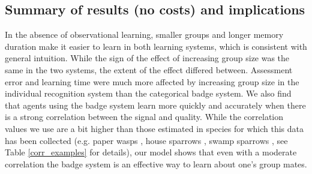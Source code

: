 \subsection*{Summary of results (no costs) and implications} %
In the absence of observational learning, smaller groups and longer memory duration make it easier to learn in both learning systems, which is consistent with general intuition. While the sign of the effect of increasing group size was the same in the two systems, the extent of the effect differed between. Assessment error and learning time were much more affected by increasing group size in the individual recognition system than the categorical badge system. We also find that agents using the badge system learn more quickly and accurately when there is a strong correlation between the signal and quality. While the correlation values we use are a bit higher than those estimated in species for which this data has been collected (e.g. paper wasps \cite{Tibbetts:2004kx}, house sparrows \cite{Veiga:1993fk}, swamp sparrows \cite{Olsen:2010uq}, see Table \ref{corr_examples} for details), our model shows that even with a moderate correlation the badge system is an effective way to learn about one's group mates. 



